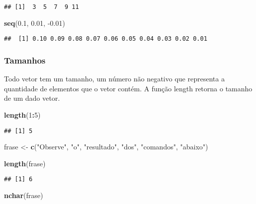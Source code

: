 \documentclass[]{book}
\newenvironment{Shaded}{\begin{snugshade}}{\end{snugshade}}
\newcommand{\DecValTok}[1]{\textcolor[rgb]{0.00,0.00,0.81}{#1}}
\newcommand{\FloatTok}[1]{\textcolor[rgb]{0.00,0.00,0.81}{#1}}
\newcommand{\KeywordTok}[1]{\textcolor[rgb]{0.13,0.29,0.53}{\textbf{#1}}}
\newcommand{\NormalTok}[1]{#1}
\newcommand{\OperatorTok}[1]{\textcolor[rgb]{0.81,0.36,0.00}{\textbf{#1}}}
\newcommand{\StringTok}[1]{\textcolor[rgb]{0.31,0.60,0.02}{#1}}
\theoremstyle{definition}
\theoremstyle{definition}
\theoremstyle{definition}
\theoremstyle{remark}
\begin{document}
\begin{verbatim}
## [1]  3  5  7  9 11
\end{verbatim}

\begin{Shaded}
\begin{Highlighting}[]
\KeywordTok{seq}\NormalTok{(}\FloatTok{0.1}\NormalTok{, }\FloatTok{0.01}\NormalTok{, }\FloatTok{-0.01}\NormalTok{)}
\end{Highlighting}
\end{Shaded}

\begin{verbatim}
##  [1] 0.10 0.09 0.08 0.07 0.06 0.05 0.04 0.03 0.02 0.01
\end{verbatim}

\hypertarget{tamanhos}{%
\subsubsection{Tamanhos}\label{tamanhos}}

Todo vetor tem um tamanho, um número não negativo que representa a quantidade de elementos que o vetor contém.
A função length retorna o tamanho de um dado vetor.

\begin{Shaded}
\begin{Highlighting}[]
\KeywordTok{length}\NormalTok{(}\DecValTok{1}\OperatorTok{:}\DecValTok{5}\NormalTok{) }
\end{Highlighting}
\end{Shaded}

\begin{verbatim}
## [1] 5
\end{verbatim}

\begin{Shaded}
\begin{Highlighting}[]
\NormalTok{frase <-}\StringTok{ }\KeywordTok{c}\NormalTok{(}\StringTok{"Observe"}\NormalTok{, }\StringTok{"o"}\NormalTok{, }\StringTok{"resultado"}\NormalTok{, }\StringTok{"dos"}\NormalTok{, }\StringTok{"comandos"}\NormalTok{, }\StringTok{"abaixo"}\NormalTok{)}

\KeywordTok{length}\NormalTok{(frase)}
\end{Highlighting}
\end{Shaded}

\begin{verbatim}
## [1] 6
\end{verbatim}

\begin{Shaded}
\begin{Highlighting}[]
\KeywordTok{nchar}\NormalTok{(frase)}
\end{Highlighting}
\end{Shaded}
\end{document}
